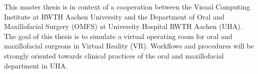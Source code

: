 This master thesis is in context of a cooperation between the Visual Computing Institute at RWTH Aachen University and the Department of Oral and Maxillofacial Surgery (OMFS) at University Hospital RWTH Aachen (UHA).
The goal of this thesis is to simulate a virtual operating room for oral and maxillofacial surgeons in Virtual Reality (VR).
Workflows and procedures will be strongly oriented towards clinical practices of the oral and maxillofacial department in UHA.


